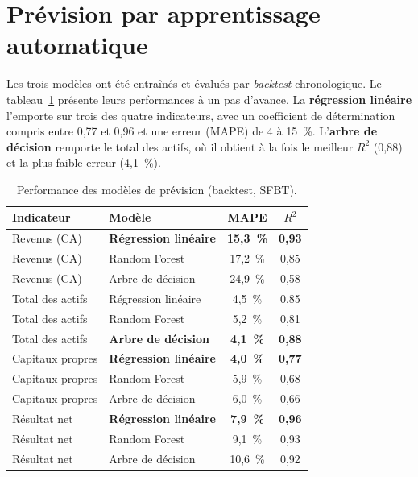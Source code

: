 \section{Prévision par apprentissage automatique}
\label{sec:realml}
\par Les trois modèles ont été entraînés et évalués par \textit{backtest}
chronologique. Le tableau~\ref{tab:ml} présente leurs performances à un pas
d'avance. La \textbf{régression linéaire} l'emporte sur trois des quatre
indicateurs, avec un coefficient de détermination compris entre 0,77 et 0,96 et
une erreur (\ac{MAPE}) de 4 à 15~\%. L'\textbf{arbre de décision} remporte le
total des actifs, où il obtient à la fois le meilleur $R^2$ (0,88) et la plus
faible erreur (4,1~\%).

\begin{table}[H]
\centering
\caption[Performance des modèles de prévision]{Performance des modèles de prévision (backtest, SFBT).}
\label{tab:ml}
\begin{tabular}{|l|l|c|c|}
\hline
\textbf{Indicateur} & \textbf{Modèle} & \textbf{MAPE} & \textbf{$R^2$} \\ \hline
Revenus (CA) & \textbf{Régression linéaire} & \textbf{15,3~\%} & \textbf{0,93} \\ \hline
Revenus (CA) & Random Forest & 17,2~\% & 0,85 \\ \hline
Revenus (CA) & Arbre de décision & 24,9~\% & 0,58 \\ \hline
Total des actifs & Régression linéaire & 4,5~\% & 0,85 \\ \hline
Total des actifs & Random Forest & 5,2~\% & 0,81 \\ \hline
Total des actifs & \textbf{Arbre de décision} & \textbf{4,1~\%} & \textbf{0,88} \\ \hline
Capitaux propres & \textbf{Régression linéaire} & \textbf{4,0~\%} & \textbf{0,77} \\ \hline
Capitaux propres & Random Forest & 5,9~\% & 0,68 \\ \hline
Capitaux propres & Arbre de décision & 6,0~\% & 0,66 \\ \hline
Résultat net & \textbf{Régression linéaire} & \textbf{7,9~\%} & \textbf{0,96} \\ \hline
Résultat net & Random Forest & 9,1~\% & 0,93 \\ \hline
Résultat net & Arbre de décision & 10,6~\% & 0,92 \\ \hline
\end{tabular}
\end{table}


